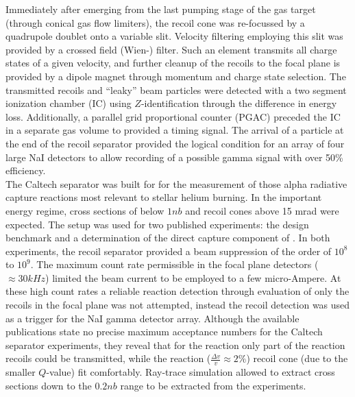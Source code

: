 Immediately after emerging from the last pumping stage of the gas target (through conical gas flow limiters), the recoil cone was re-focussed by a quadrupole doublet onto a variable slit. Velocity filtering employing this slit was provided by a crossed field (Wien-) filter. Such an element transmits all charge states of a given velocity, and further cleanup of the recoils to the focal plane is provided by a dipole magnet through momentum and charge state selection. The transmitted recoils and “leaky” beam particles were detected with a two segment ionization chamber (IC) using $Z$-identification through the difference in energy loss. Additionally, a parallel grid proportional counter (PGAC) preceded the IC in a separate gas volume to provided a timing signal. The arrival of a particle at the end of the recoil separator provided the logical condition for an array of four large NaI detectors to allow recording of a possible gamma signal with over 50\% efficiency.\\ 
The Caltech separator was built for for the measurement of those alpha radiative capture reactions most relevant to stellar helium burning. In the important energy regime, cross sections of below $1 \unit{nb}$ and recoil cones above 15 mrad were expected. The setup was used for two published experiments: the design benchmark \reac{\alpha}{\gamma} \cite{krem88} and a determination of the direct capture component of \reac{\alpha}{\gamma} \cite{hahn87}. In both experiments, the recoil separator provided a beam suppression of the order of $10^8$ to $10^9$. The maximum count rate permissible in the focal plane detectors ($\approx 30 \unit{kHz}$) limited the beam current to be employed to a few micro-Ampere. At these high count rates a reliable reaction detection through evaluation of only the recoils in the focal plane was not attempted, instead the recoil detection was used as a trigger for the NaI gamma detector array. Although the available publications state no precise maximum acceptance numbers for the Caltech separator experiments, they reveal that for the \reac{\alpha}{\gamma} reaction only part of the reaction recoils could be transmitted, while the \reac{\alpha}{\gamma} reaction ($\frac{\Delta{}v}{v} \approx 2 \%$) recoil cone (due to the smaller $Q$-value) fit comfortably. Ray-trace simulation allowed to extract cross sections down to the $0.2 \unit{nb}$ range to be extracted from the experiments.\\ 
